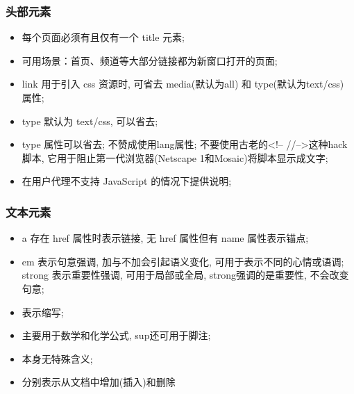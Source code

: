 \documentclass[letterpaper,10pt,english]{sphinxmanual}
\begin{document}
\subsubsection{头部元素}
\label{styleguide/html-coding-style:id7}\begin{itemize}
\item {}
 每个页面必须有且仅有一个 title 元素;

\item {}
 可用场景：首页、频道等大部分链接都为新窗口打开的页面;

\item {}
 link 用于引入 css 资源时, 可省去 media(默认为all) 和 type(默认为text/css) 属性;

\item {}
 type 默认为 text/css, 可以省去;

\item {}
 type 属性可以省去; 不赞成使用lang属性; 不要使用古老的\textless{}!– //–\textgreater{}这种hack脚本, 它用于阻止第一代浏览器(Netscape 1和Mosaic)将脚本显示成文字;

\item {}
 在用户代理不支持 JavaScript 的情况下提供说明;

\end{itemize}


\subsubsection{文本元素}
\label{styleguide/html-coding-style:id8}\begin{itemize}
\item {}
 a 存在 href 属性时表示链接, 无 href 属性但有 name 属性表示锚点;

\item {}
 em 表示句意强调, 加与不加会引起语义变化, 可用于表示不同的心情或语调; strong 表示重要性强调, 可用于局部或全局, strong强调的是重要性, 不会改变句意;

\item {}
 表示缩写;

\item {}
 主要用于数学和化学公式, sup还可用于脚注;

\item {}
 本身无特殊含义;

\item {}
 分别表示从文档中增加(插入)和删除

\end{itemize}
\end{document}
